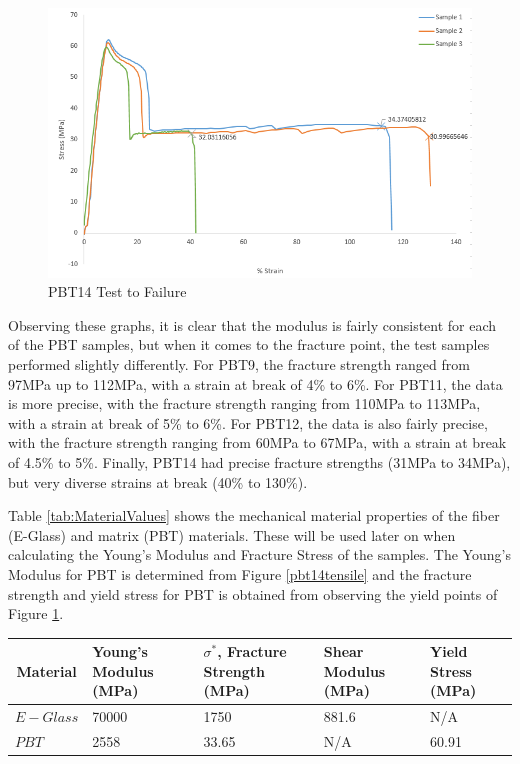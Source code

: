 \documentclass[11pt]{article}
\begin{document}
\begin{figure}[H]
\centering
\includegraphics[width=.95\linewidth]{figures/PBT14_Fail.png}
\caption{PBT14 Test to Failure}
\label{pbt14fail}
\end{figure}

Observing these graphs, it is clear that the modulus is fairly consistent for each of the PBT samples, but when it comes to the fracture point, the test samples performed slightly differently. For PBT9, the fracture strength ranged from 97MPa up to 112MPa, with a strain at break of 4\% to 6\%. For PBT11, the data is more precise, with the fracture strength ranging from 110MPa to 113MPa, with a strain at break of 5\% to 6\%. For PBT12, the data is also fairly precise, with the fracture strength ranging from 60MPa to 67MPa, with a strain at break of 4.5\% to 5\%. Finally, PBT14 had precise fracture strengths (31MPa to 34MPa), but very diverse strains at break (40\% to 130\%).

Table \ref{tab:MaterialValues} shows the mechanical material properties of the fiber (E-Glass) and matrix (PBT) materials. These will be used later on when calculating the Young's Modulus and Fracture Stress of the samples. The Young's Modulus for PBT is determined from Figure \ref{pbt14tensile} and the fracture strength and yield stress for PBT is obtained from observing the yield points of Figure \ref{pbt14fail}.

\onehalfspacing
\begin{center}
 \label{tab:MaterialValues}
\begin{tabular}{p{2cm} || p{2.75cm} | p{2.75cm} | p{2.75cm} | p{2.75cm} }
\hline
\multicolumn{1}{c||}{Material} & Young's Modulus (MPa) & \(\sigma^*\), Fracture Strength (MPa) & Shear Modulus (MPa) & Yield Stress (MPa)\\
\hline
\hline
\(E-Glass\) & 70000 &  1750 & 881.6 & N/A \\
\(PBT\) & 2558 & 33.65 & N/A & 60.91\\
\hline
\end{tabular}
\end{center}
\singlespacing
\end{document}
